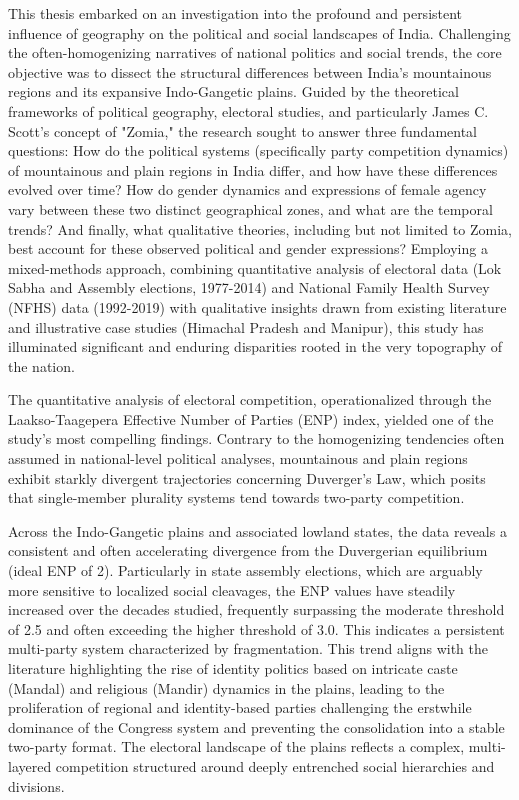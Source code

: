 

This thesis embarked on an investigation into the profound and persistent influence of geography on the political and social landscapes of India. Challenging the often-homogenizing narratives of national politics and social trends, the core objective was to dissect the structural differences between India's mountainous regions and its expansive Indo-Gangetic plains. Guided by the theoretical frameworks of political geography, electoral studies, and particularly James C. Scott's concept of "Zomia," the research sought to answer three fundamental questions: How do the political systems (specifically party competition dynamics) of mountainous and plain regions in India differ, and how have these differences evolved over time? How do gender dynamics and expressions of female agency vary between these two distinct geographical zones, and what are the temporal trends? And finally, what qualitative theories, including but not limited to Zomia, best account for these observed political and gender expressions? Employing a mixed-methods approach, combining quantitative analysis of electoral data (Lok Sabha and Assembly elections, 1977-2014) and National Family Health Survey (NFHS) data (1992-2019) with qualitative insights drawn from existing literature and illustrative case studies (Himachal Pradesh and Manipur), this study has illuminated significant and enduring disparities rooted in the very topography of the nation.


The quantitative analysis of electoral competition, operationalized through the Laakso-Taagepera Effective Number of Parties (ENP) index, yielded one of the study's most compelling findings. Contrary to the homogenizing tendencies often assumed in national-level political analyses, mountainous and plain regions exhibit starkly divergent trajectories concerning Duverger's Law, which posits that single-member plurality systems tend towards two-party competition.

Across the Indo-Gangetic plains and associated lowland states, the data reveals a consistent and often accelerating divergence from the Duvergerian equilibrium (ideal ENP of 2). Particularly in state assembly elections, which are arguably more sensitive to localized social cleavages, the ENP values have steadily increased over the decades studied, frequently surpassing the moderate threshold of 2.5 and often exceeding the higher threshold of 3.0. This indicates a persistent multi-party system characterized by fragmentation. This trend aligns with the literature highlighting the rise of identity politics based on intricate caste (Mandal) and religious (Mandir) dynamics in the plains, leading to the proliferation of regional and identity-based parties challenging the erstwhile dominance of the Congress system and preventing the consolidation into a stable two-party format. The electoral landscape of the plains reflects a complex, multi-layered competition structured around deeply entrenched social hierarchies and divisions.

